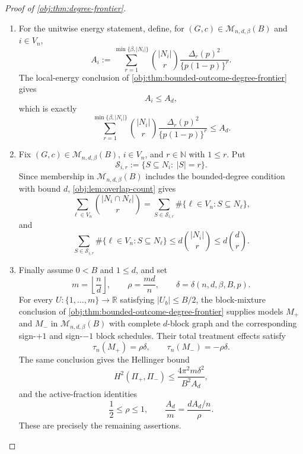 \begin{proof}[Proof of \cref{obj:thm:degree-frontier}]
\begin{enumerate}
\item
For the unitwise energy statement, define, for \((G,c)\in\mathcal M_{n,d,\beta}(B)\) and \(i\in V_n\),
\[
A_i:=
\sum_{r=1}^{\min\{\beta,|N_i|\}}
\binom{|N_i|}{r}
\frac{\Delta_r(p)^2}{\{p(1-p)\}^r}.
\]
The local-energy conclusion of \cref{obj:thm:bounded-outcome-degree-frontier} gives
\[
A_i\le A_d,
\]
which is exactly
\[
\sum_{r=1}^{\min\{\beta,|N_i|\}}
\binom{|N_i|}{r}
\frac{\Delta_r(p)^2}{\{p(1-p)\}^r}
\le
A_d.
\] %

\item
Fix \((G,c)\in\mathcal M_{n,d,\beta}(B)\), \(i\in V_n\), and \(r\in\mathbb N\) with \(1\le r\).  Put
\[
\mathcal S_{i,r}:=\{S\subseteq N_i:\ |S|=r\}.
\]
Since membership in \(\mathcal M_{n,d,\beta}(B)\) includes the bounded-degree condition with bound \(d\), \cref{obj:lem:overlap-count} gives
\[
\sum_{\ell\in V_n}
\binom{|N_i\cap N_\ell|}{r}
=
\sum_{S\in\mathcal S_{i,r}}
\#\{\ell\in V_n:S\subseteq N_\ell\},
\]
and
\[
\sum_{S\in\mathcal S_{i,r}}
\#\{\ell\in V_n:S\subseteq N_\ell\}
\le
d\binom{|N_i|}{r}
\le
d\binom{d}{r}.
\] %

\item
Finally assume \(0<B\) and \(1\le d\), and set
\[
m=\left\lfloor\frac nd\right\rfloor,
\qquad
\rho=\frac{md}{n},
\qquad
\delta=\delta(n,d,\beta,B,p).
\]
For every \(U:\{1,\ldots,m\}\to\mathbb R\) satisfying \(|U_b|\le B/2\), the block-mixture conclusion of \cref{obj:thm:bounded-outcome-degree-frontier} supplies models \(M_+\) and \(M_-\) in \(\mathcal M_{n,d,\beta}(B)\) with complete \(d\)-block graph and the corresponding sign-\(+1\) and sign-\(-1\) block schedules.  Their total treatment effects satisfy
\[
\tau_n(M_+)=\rho\delta,
\qquad
\tau_n(M_-)=-\rho\delta.
\]
The same conclusion gives the Hellinger bound
\[
H^2(\Pi_+,\Pi_-)
\le
\frac{4\pi^2m\delta^2}{B^2A_d},
\]
and the active-fraction identities
\[
\frac12\le\rho\le1,
\qquad
\frac{A_d}{m}
=
\frac{dA_d/n}{\rho}.
\]
These are precisely the remaining assertions. %
\end{enumerate}
\end{proof}

